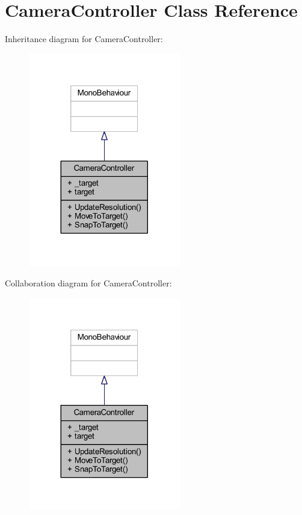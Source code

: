 \hypertarget{class_camera_controller}{}\section{Camera\+Controller Class Reference}
\label{class_camera_controller}


Inheritance diagram for Camera\+Controller\+:\nopagebreak
\begin{figure}[H]
\begin{center}
\leavevmode
\includegraphics[width=188pt]{class_camera_controller__inherit__graph}
\end{center}
\end{figure}


Collaboration diagram for Camera\+Controller\+:\nopagebreak
\begin{figure}[H]
\begin{center}
\leavevmode
\includegraphics[width=188pt]{class_camera_controller__coll__graph}
\end{center}
\end{figure}
